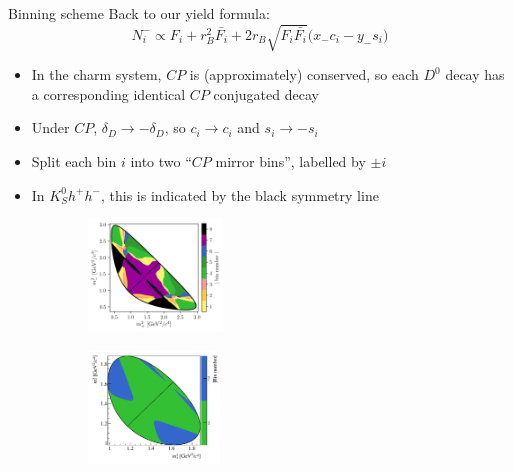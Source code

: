\documentclass{beamer}
\begin{document}
\begin{frame}{Binning scheme}
  \vspace{0.0cm}
  {\large Back to our yield formula:}
  \begin{equation*}
    N_i^-\propto F_i + r_B^2\bar{F_i} + 2r_B\sqrt{F_i\bar{F_i}}\big(x_-c_i - y_-s_i\big)
  \end{equation*}
  \vspace{-0.3cm}
  \begin{itemize}
    \setlength\itemsep{0.5em}
    \item{In the charm system, $C\!P$ is (approximately) conserved, so each $D^0$ decay has a corresponding identical $C\!P$ conjugated decay}
    \item{Under $C\!P$, $\delta_D\to-\delta_D$, so $c_i\to c_i$ and $s_i\to -s_i$}
    \item{Split each bin $i$ into two ``$C\!P$ mirror bins'', labelled by $\pm i$}
    \item{In $K_S^0h^+h^-$, this is indicated by the black symmetry line}
  \end{itemize}
  \begin{figure}
    \centering
    \begin{subfigure}{0.45\textwidth}
      \centering
      \includegraphics[height = 3cm]{Plots/KsPiPi_optimal.png}
    \end{subfigure}%
    \begin{subfigure}{0.45\textwidth}
      \centering
      \includegraphics[height = 3cm]{Plots/KsKK_binning.png}
    \end{subfigure}
  \end{figure}
\end{frame}
\end{document}
